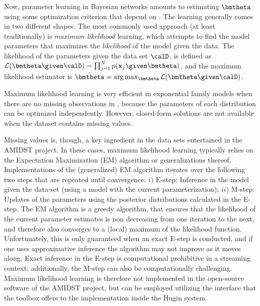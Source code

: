Now, parameter learning in Bayesian networks amounts to estimating $\bmtheta$ using some optimization criterion that depend on \calD. The learning generally comes in two different shapes. The most commonly used approach (at least  traditionally) is \textit{maximum likelihood} learning, which attempts to find the model parameters that maximizes the \textit{likelihood} of the model given the data. 
The likelihood of the parameters given the data set $\calD$, 
is defined as  $\mathcal{L}(\bmtheta \given \calD)= \prod_{j=1}^N p(\bx_j\given\bmtheta)$,
and the maximum likelihood estimator is $\hat{\bmtheta}=\arg\max_{\bmtheta} \mathcal{L}(\bmtheta \given \calD)$. 

Maximum likelihood learning is very efficient in exponential family models when there are no missing observations in \calD, because the parameters of each distribution can be optimized independently. 
However, closed-form solutions are not available when the dataset contains missing values. 

Missing values is, though, a key ingredient in the data sets entertained in the AMIDST project. In these cases, maximum likelihood learning typically relies on the  Expectation Maximization (EM) algorithm or generalizations thereof. 
Implementations of the (generalized) EM algorithm iterates over the following two steps that are repeated until convergence: 
$i)$ E-step: Inference in the model given the data-set (using a model with the current parameterization); 
$ii)$ M-step: Updates of the parameters using the posterior distributions calculated in the E-step. 
The EM algorithm is a greedy algorithm, that ensures that the likelihood of the current parameter estimates is non decreasing from one iteration to the next, and therefore also converges to a (local) maximum of the likelihood function. 
Unfortunately, this is only guaranteed when an exact E-step is conducted, and if one uses approximative inference the algorithm may not improve as it moves along. 
Exact inference in the E-step is computational prohibitive in a streaming context; additionally, the M-step can also be computationally challenging. 
Maximum likelihood learning is therefore not implemented in the open-source software of the AMIDST project, but can be employed utilizing the interface that the toolbox offers to the implementation inside the Hugin system.

